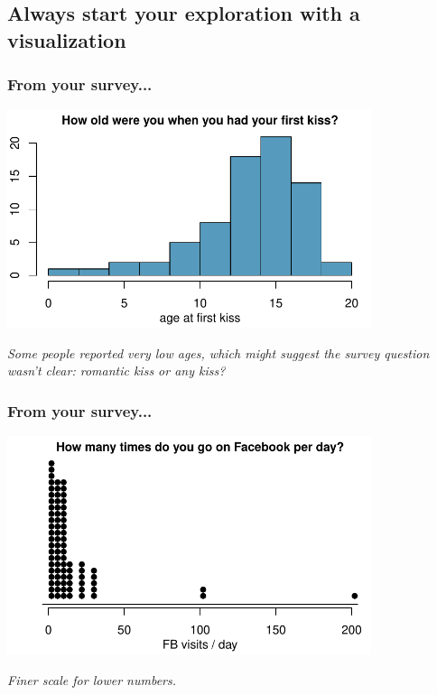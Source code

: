 \documentclass[slidestop,compress,mathserif,12pt,t,professionalfonts,xcolor=table]{beamer}
\newcommand{\soln}[1]{\textit{#1}}
\begin{document}

\subsection{Always start your exploration with a visualization}
\label{mi1}


\begin{frame}[fragile]
\frametitle{From your survey...}


\begin{center}
\includegraphics[width=0.8\textwidth]{figures/survey/hist_first_kiss} 
\end{center}

\pause

\soln{Some people reported very low ages, which might suggest the survey
  question wasn't clear: romantic kiss or any kiss?}

\end{frame}


\begin{frame}[fragile]
\frametitle{From your survey...}


\begin{center}
\includegraphics[width=0.8\textwidth]{figures/survey/dot_fb_visits_per_day} 
\end{center}

\pause

\soln{Finer scale for lower numbers.}

\end{frame}
\end{document}
